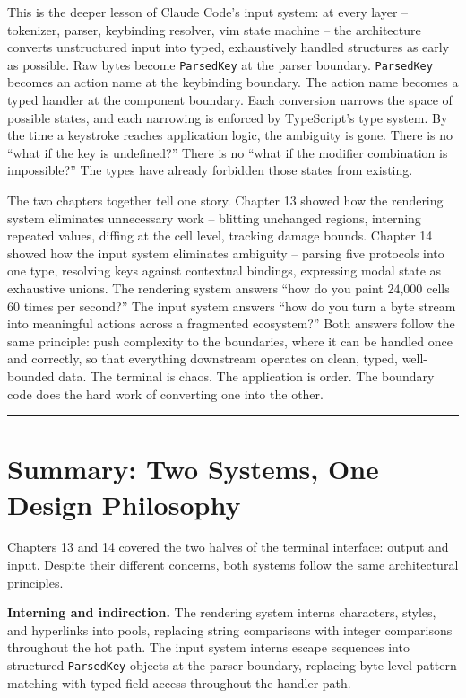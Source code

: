 \documentclass[
  english,
  11pt,
  letterpaper,
]{book}
\begin{document}
This is the deeper lesson of Claude Code's input system: at every layer
-- tokenizer, parser, keybinding resolver, vim state machine -- the
architecture converts unstructured input into typed, exhaustively
handled structures as early as possible. Raw bytes become
\texttt{ParsedKey} at the parser boundary. \texttt{ParsedKey} becomes an
action name at the keybinding boundary. The action name becomes a typed
handler at the component boundary. Each conversion narrows the space of
possible states, and each narrowing is enforced by TypeScript's type
system. By the time a keystroke reaches application logic, the ambiguity
is gone. There is no ``what if the key is undefined?'' There is no
``what if the modifier combination is impossible?'' The types have
already forbidden those states from existing.

The two chapters together tell one story. Chapter 13 showed how the
rendering system eliminates unnecessary work -- blitting unchanged
regions, interning repeated values, diffing at the cell level, tracking
damage bounds. Chapter 14 showed how the input system eliminates
ambiguity -- parsing five protocols into one type, resolving keys
against contextual bindings, expressing modal state as exhaustive
unions. The rendering system answers ``how do you paint 24,000 cells 60
times per second?'' The input system answers ``how do you turn a byte
stream into meaningful actions across a fragmented ecosystem?'' Both
answers follow the same principle: push complexity to the boundaries,
where it can be handled once and correctly, so that everything
downstream operates on clean, typed, well-bounded data. The terminal is
chaos. The application is order. The boundary code does the hard work of
converting one into the other.

\begin{center}\rule{0.5\linewidth}{0.5pt}\end{center}

\section{Summary: Two Systems, One Design
Philosophy}\label{summary-two-systems-one-design-philosophy}

Chapters 13 and 14 covered the two halves of the terminal interface:
output and input. Despite their different concerns, both systems follow
the same architectural principles.

\textbf{Interning and indirection.} The rendering system interns
characters, styles, and hyperlinks into pools, replacing string
comparisons with integer comparisons throughout the hot path. The input
system interns escape sequences into structured \texttt{ParsedKey}
objects at the parser boundary, replacing byte-level pattern matching
with typed field access throughout the handler path.
\end{document}
